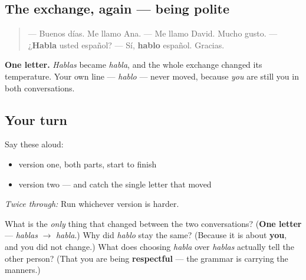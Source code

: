 \subsection*{The exchange, again — being polite}
\begin{quote}
— Buenos días. Me llamo Ana. — Me llamo David. Mucho gusto. — ¿\textbf{Habla} usted español? — Sí, \textbf{hablo} español. Gracias.
\end{quote}

\textbf{One letter.} \emph{Hablas} became \emph{habla}, and the whole exchange changed its temperature. Your own line — \emph{hablo} — never moved, because \emph{you} are still you in both conversations.

\subsection*{Your turn}
Say these aloud:

\begin{itemize}
\raggedright
  \item version one, both parts, start to finish
  \item version two — and catch the single letter that moved
\end{itemize}

\emph{Twice through:} Run whichever version is harder.

\begin{tcolorbox}[breakable,colback=teal!4,colframe=teal!35!black,title={Before you move on}]
What is the \emph{only} thing that changed between the two conversations? (\textbf{One letter} — \emph{hablas} $\to$ \emph{habla}.) Why did \emph{hablo} stay the same? (Because it is about \textbf{you}, and you did not change.) What does choosing \emph{habla} over \emph{hablas} actually tell the other person? (That you are being \textbf{respectful} — the grammar is carrying the manners.)
\end{tcolorbox}
